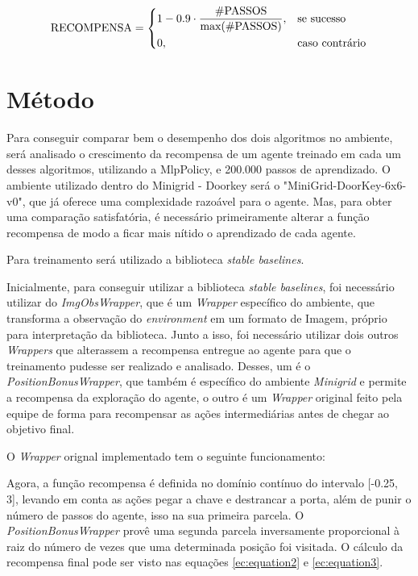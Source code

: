 \documentclass[9pt,a4paper,twoside]{tau}
\begin{document}
\begin{equation}
    \label{ec:equation}
    \text{RECOMPENSA} =
    \begin{dcases}
        1-0.9\cdot\frac{\text{\#PASSOS}}{\text{max(\#PASSOS)}}, & \text{se sucesso}     \\
        0,                                                      & \text{caso contrário}
    \end{dcases}
\end{equation}


\section{Método}

Para conseguir comparar bem o desempenho dos dois algoritmos no ambiente, será analisado o crescimento da recompensa de um agente treinado em cada um desses algoritmos, utilizando a MlpPolicy, e 200.000 passos de aprendizado. O ambiente utilizado dentro do Minigrid - Doorkey será o "MiniGrid-DoorKey-6x6-v0", que já oferece uma complexidade razoável para o agente. Mas, para obter uma comparação satisfatória, é necessário primeiramente alterar a função recompensa de modo a ficar mais nítido o aprendizado de cada agente.

\begin{info}[frametitle=Atenção]
    Para treinamento será utilizado a biblioteca \textit{stable baselines}.
\end{info}

Inicialmente, para conseguir utilizar a biblioteca \textit{stable baselines}, foi necessário utilizar do \textit{ImgObsWrapper}, que é um \textit{Wrapper} específico do ambiente, que transforma a observação do \textit{environment} em um formato de Imagem, próprio para interpretação da biblioteca. Junto a isso, foi necessário utilizar dois outros \textit{Wrappers} que alterassem a recompensa entregue ao agente para que o treinamento pudesse ser realizado e analisado. Desses, um é o \textit{PositionBonusWrapper}, que também é específico do ambiente \textit{Minigrid} e permite a recompensa da exploração do agente, o outro é um \textit{Wrapper} original feito pela equipe de forma para recompensar as ações intermediárias antes de chegar ao objetivo final.

O \textit{Wrapper} orignal implementado tem o seguinte funcionamento:


Agora, a função recompensa é definida no domínio contínuo do intervalo [-0.25, 3], levando em conta as ações pegar a chave e destrancar a porta, além de punir o número de passos do agente, isso na sua primeira parcela. O \textit{PositionBonusWrapper} provê uma segunda parcela inversamente proporcional à raiz do número de vezes que uma determinada posição foi visitada. O cálculo da recompensa final pode ser visto nas equações \ref{ec:equation2} e \ref{ec:equation3}.
\end{document}

